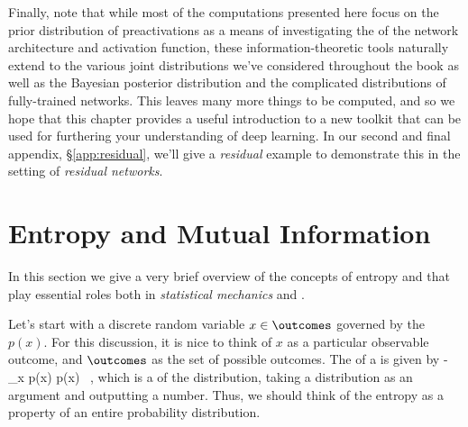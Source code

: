 Finally, note that while most of the computations presented here focus on the prior distribution of preactivations as a means of investigating the  of the network architecture and activation function, these information-theoretic tools naturally extend to the various joint distributions we've considered throughout the book as well as the Bayesian posterior distribution and the complicated distributions of fully-trained networks. This leaves many more things to be computed, and so we hope that this chapter provides a useful introduction to a new toolkit that can be used for furthering your understanding of deep learning. 
In our second and final appendix, \S\ref{app:residual}, we'll give a \emph{residual} example 
to demonstrate this
in the setting of \emph{residual networks}.


























\section{Entropy and Mutual Information}\label{sec:information-theory}
In this section we give a very brief overview of the concepts of entropy and  that play essential roles both in %
\emph{statistical mechanics} \cite{boltzmann}
and 
 \cite{Shannon-1,Shannon-2}.



Let's start with a discrete random variable $x\in\outcomes$ 
governed by the  $p(x)$.
For this discussion, it is nice to think of $x$ as a particular observable outcome, and $\outcomes$ as the set of possible outcomes.
The  of a  is given by 
\be\label{eq:entropy-shannon-formula-sum}
\entropy\!\le[p(x)\ri]
\equiv - \sum_{x \in \outcomes} p(x) \log p(x)  
\, ,
\ee
which is a  of the distribution, taking a
distribution as an argument and outputting a number. Thus, we should think of the entropy as a property of an entire probability distribution.


